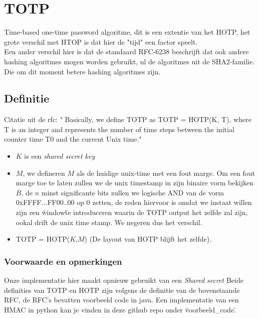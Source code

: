 \documentclass[10pt,a4paper]{report}
\begin{document}
\begin{section}
\section*{TOTP}
Time-based one-time password algoritme, dit is een extentie van het HOTP, het grote verschil met HTOP is dat hier de "tijd" een factor speelt.\\

Een ander verschil hier is dat de standaard RFC-6238 beschrijft dat ook andere hashing algoritmes mogen worden gebruikt, nl de algoritmes uit de SHA2-familie. Die om dit moment betere hashing algoritmes zijn.
\subsection*{Definitie}
Citatie uit de rfc: " 
Basically, we define TOTP as TOTP = HOTP(K, T), where T is an integer
and represents the number of time steps between the initial counter
time T0 and the current Unix time."
\begin{itemize}
\item $K$ is een \emph{shared secret key}
\item $M$, we defineren $M$ als de huidige unix-time met een fout marge. Om een fout marge toe te laten zullen we de unix timestamp in zijn binaire vorm bekijken $B$, de $n$ minst significante bits zullen we logische AND van de vorm 0xFFFF...FF00..00 op 0 zetten, de reden hiervoor is omdat we instaat willen zijn een \"window\" te introduceren waarin de TOTP output het zelfde zal zijn, ookal drift de unix time stamp. We negeren dus het verschil. 
\item TOTP = HOTP($K$,$M$) (De layout van HOTP blijft het zelfde).
\end{itemize}
\subsubsection*{Voorwaarde en opmerkingen}
Onze implementatie hier maakt opnieuw gebruikt van een \emph{Shared secret}
Beide definities van TOTP en HOTP zijn volgens de definitie van de bovenstaande RFC, de RFC's bevatten voorbeeld code in java. Een implementatie van een HMAC in python kan je vinden in deze github repo onder \"voorbeeld\_code\".
\end{section}
\end{document}
